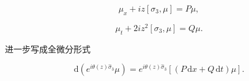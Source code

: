 \documentclass[
    lang=cn,
    scheme=chinese,
    mode=simple,
    device=normal,
    color=blue,
    math=cm,
    thmcnt=section,
    12pt,
    nowatermark
]{elegantbook}
\begin{document}
\begin{equation}
    \mu_x+iz[\sigma_3,\mu]=P\mu,
    \tag{5.1.7}
    \label{eq:5.1.7}
\end{equation}

\begin{equation}
    \mu_t+2iz^2[\sigma_3,\mu]=Q\mu.
    \tag{5.1.8}
    \label{eq:5.1.8}
\end{equation}

进一步写成全微分形式

\begin{equation}
    \mathrm d\!\left(e^{i\theta(z)\widehat{\sigma}_3}\mu\right)
    =
    e^{i\theta(z)\widehat{\sigma}_3}
    \left[(P\,\mathrm dx+Q\,\mathrm dt)\mu\right].
    \tag{5.1.9}
    \label{eq:5.1.9}
\end{equation}









\end{document}
